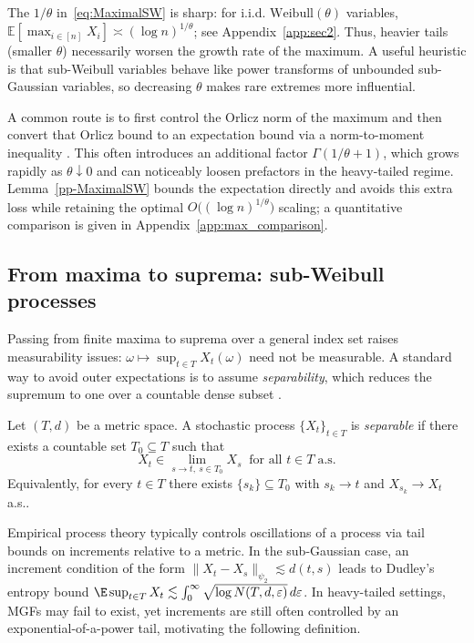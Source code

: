 \documentclass[11pt]{article}
\begin{document}
The $1/\theta$ in~\eqref{eq:MaximalSW} is sharp: for i.i.d.
$\mathrm{Weibull}(\theta)$ variables,
$\mathbb{E}[\max_{i\in [n]}X_i]\asymp (\log n)^{1/\theta}$; see Appendix~\ref{app:sec2}.
Thus, heavier tails (smaller $\theta$) necessarily worsen the growth rate of the
maximum.  A useful heuristic is that sub-Weibull variables behave like power
transforms of unbounded sub-Gaussian variables, so decreasing $\theta$ makes
rare extremes more influential.

A common route is to first control the Orlicz norm of the maximum and then
convert that Orlicz bound to an expectation bound via a norm-to-moment
inequality \citep{mendes2023concentration, zhang2022sharper}.  This often
introduces an additional factor $\Gamma(1/\theta+1)$, which grows rapidly as
$\theta\downarrow0$ and can noticeably loosen prefactors in the heavy-tailed
regime.  Lemma~\ref{pp-MaximalSW} bounds the expectation directly and avoids this
extra loss while retaining the optimal $O\bigl((\log n)^{1/\theta}\bigr)$
scaling; a quantitative comparison is given in Appendix~\ref{app:max_comparison}.




\subsection{From maxima to suprema: sub-Weibull processes}

Passing from finite maxima to suprema over a general index set raises
measurability issues: $\omega\mapsto\sup_{t\in T}X_t(\omega)$ need not be
measurable.  A standard way to avoid outer expectations is to assume
\emph{separability}, which reduces the supremum to one over a countable dense
subset \citep[Definition~5.22]{vanhandle2016probability}.

\begin{definition}\label{def:separable}
Let $(T,d)$ be a metric space. A stochastic process $\{X_t\}_{t\in T}$ is
\emph{separable} if there exists a countable set $T_0\subseteq T$ such that
\[
X_t \in \lim_{s \to t,~s \in T_0} X_s\;\;\text{for all } t \in T\;\text{a.s.}
\]
Equivalently, for every $t\in T$ there exists $\{s_k\}\subseteq T_0$ with
$s_k\to t$ and $X_{s_k}\to X_t$ a.s..
\end{definition}

Empirical process theory typically controls oscillations of a process via tail
bounds on increments relative to a metric.  In the sub-Gaussian case, an
increment condition of the form
$\|X_t-X_s\|_{\psi_2}\lesssim d(t,s)$ leads to Dudley's entropy bound
\(\E\sup_{t\in T}X_t\lesssim\int_0^{\infty}\sqrt{\log N(T,d,\varepsilon)}\,d\varepsilon\).
In heavy-tailed settings, MGFs may fail to exist, yet increments are still often
controlled by an exponential-of-a-power tail, motivating the following
definition.
\end{document}

